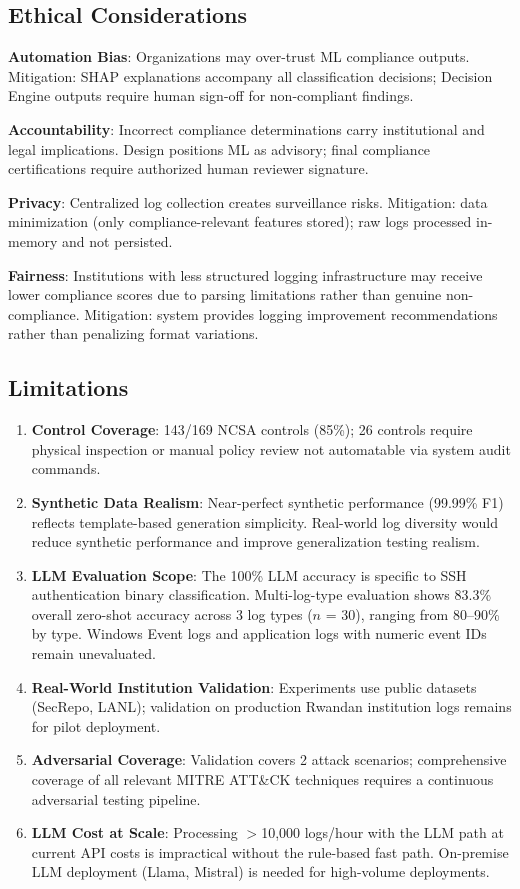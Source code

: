 \documentclass[futureinternet,article,submit,pdftex,moreauthors]{Definitions/mdpi}
\begin{document}
\subsection{Ethical Considerations}

\textbf{Automation Bias}: Organizations may over-trust ML compliance outputs. Mitigation:
SHAP explanations accompany all classification decisions; Decision Engine outputs require
human sign-off for non-compliant findings.

\textbf{Accountability}: Incorrect compliance determinations carry institutional and legal
implications. Design positions ML as advisory; final compliance certifications require
authorized human reviewer signature.

\textbf{Privacy}: Centralized log collection creates surveillance risks. Mitigation:
data minimization (only compliance-relevant features stored); raw logs processed in-memory
and not persisted.

\textbf{Fairness}: Institutions with less structured logging infrastructure may receive lower
compliance scores due to parsing limitations rather than genuine non-compliance. Mitigation:
system provides logging improvement recommendations rather than penalizing format variations.

\subsection{Limitations}

\begin{enumerate}
\item \textbf{Control Coverage}: 143/169 NCSA controls (85\%); 26 controls require physical
inspection or manual policy review not automatable via system audit commands.
\item \textbf{Synthetic Data Realism}: Near-perfect synthetic performance (99.99\% F1)
reflects template-based generation simplicity. Real-world log diversity would reduce synthetic
performance and improve generalization testing realism.
\item \textbf{LLM Evaluation Scope}: The 100\% LLM accuracy is specific to SSH authentication
binary classification. Multi-log-type evaluation shows 83.3\% overall zero-shot accuracy
across 3 log types ($n$ = 30), ranging from 80--90\% by type. Windows Event logs and
application logs with numeric event IDs remain unevaluated.
\item \textbf{Real-World Institution Validation}: Experiments use public datasets
(SecRepo, LANL); validation on production Rwandan institution logs remains for pilot
deployment.
\item \textbf{Adversarial Coverage}: Validation covers 2 attack scenarios; comprehensive
coverage of all relevant MITRE ATT\&CK techniques requires a continuous adversarial testing
pipeline.
\item \textbf{LLM Cost at Scale}: Processing ${>}$10{,}000 logs/hour with the LLM path at
current API costs is impractical without the rule-based fast path. On-premise LLM deployment
(Llama, Mistral) is needed for high-volume deployments.
\end{enumerate}
\end{document}

